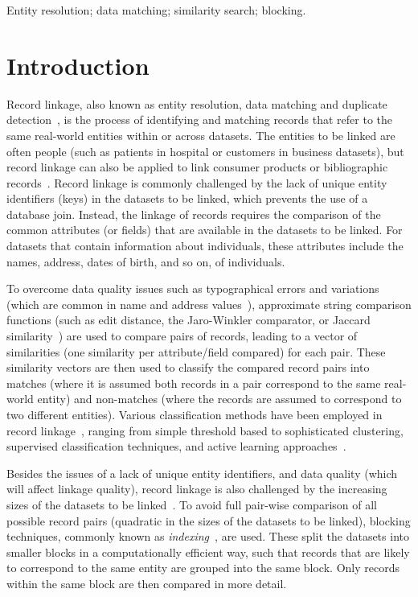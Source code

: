 \documentclass{llncs}
\begin{document}
\keywords Entity resolution; data matching; similarity search;
         blocking.



\section{Introduction}
\label{sec-intro}


Record linkage, also known as entity resolution, data matching and
duplicate detection~\cite{Chr12}, is the process of identifying and
matching records that refer to the same real-world entities within or
across datasets. The entities to be linked are often people (such as
patients in hospital or customers in business datasets), but record
linkage can also be applied to link consumer products or bibliographic
records~\cite{Chr12}. Record linkage is commonly challenged by the lack
of unique entity identifiers (keys) in the datasets to be linked, which
prevents the use of a database join. Instead, the linkage of records
requires the comparison of the common attributes (or fields) that are available
in the datasets to be linked. For datasets that contain
information about individuals, these attributes include the names,
address, dates of birth, and so on, of individuals.

To overcome data quality issues such as typographical errors and
variations (which are common in name and address values~\cite{Chr12}),
approximate string comparison functions (such as edit distance, the
Jaro-Winkler comparator, or Jaccard similarity~\cite{Chr12}) are used to
compare pairs of records, leading to a vector of similarities (one
similarity per attribute/field compared) for each pair. These similarity
vectors are then used to classify the compared record pairs into matches
(where it is assumed both records in a pair correspond to the same
real-world entity) and non-matches (where the records are assumed to
correspond to two different entities). Various classification methods
have been employed in record linkage~\cite{Chr12,Don15}, ranging from
simple threshold based to sophisticated clustering, supervised
classification techniques, and active learning approaches~\cite{Wan15}.

Besides the issues of a lack of unique entity identifiers, and data
quality (which will affect linkage quality), record linkage is also
challenged by the increasing sizes of the datasets to be
linked~\cite{Don15}. To avoid full pair-wise comparison of all possible
record pairs (quadratic in the sizes of the datasets to be linked),
blocking techniques, commonly known as \emph{indexing}~\cite{Chr12b},
are used. These split the datasets into smaller blocks in a
computationally efficient way, such that records that are likely to
correspond to the same entity are grouped into the same block. Only
records within the same block are then compared in more detail.
\end{document}
